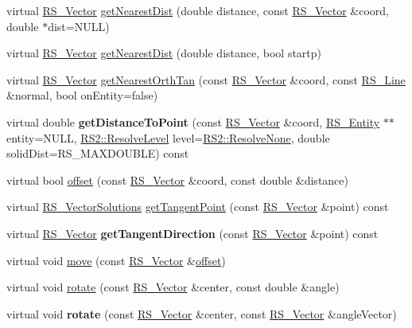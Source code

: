 \begin{DoxyCompactItemize}
\item 
virtual \hyperlink{classRS__Vector}{R\-S\-\_\-\-Vector} \hyperlink{classRS__Circle_a8a7912f997924444bdfa100523d45277}{get\-Nearest\-Dist} (double distance, const \hyperlink{classRS__Vector}{R\-S\-\_\-\-Vector} \&coord, double $\ast$dist=N\-U\-L\-L)
\item 
virtual \hyperlink{classRS__Vector}{R\-S\-\_\-\-Vector} \hyperlink{classRS__Circle_ae2e411dd60b5b677287dde169e562ad9}{get\-Nearest\-Dist} (double distance, bool startp)
\item 
virtual \hyperlink{classRS__Vector}{R\-S\-\_\-\-Vector} \hyperlink{classRS__Circle_a89c9c99d158048aed5c04367e4c7ab56}{get\-Nearest\-Orth\-Tan} (const \hyperlink{classRS__Vector}{R\-S\-\_\-\-Vector} \&coord, const \hyperlink{classRS__Line}{R\-S\-\_\-\-Line} \&normal, bool on\-Entity=false)
\item 
\hypertarget{classRS__Circle_ad7cb3c8cd0ae93cb5d62aa355a77c2d9}{virtual double {\bfseries get\-Distance\-To\-Point} (const \hyperlink{classRS__Vector}{R\-S\-\_\-\-Vector} \&coord, \hyperlink{classRS__Entity}{R\-S\-\_\-\-Entity} $\ast$$\ast$entity=N\-U\-L\-L, \hyperlink{classRS2_a1b2c5e3a3e9d1b03a9564229255faa20}{R\-S2\-::\-Resolve\-Level} level=\hyperlink{classRS2_a1b2c5e3a3e9d1b03a9564229255faa20aecb7396f39bc313ad8903c8a5fac5a50}{R\-S2\-::\-Resolve\-None}, double solid\-Dist=R\-S\-\_\-\-M\-A\-X\-D\-O\-U\-B\-L\-E) const }\label{classRS__Circle_ad7cb3c8cd0ae93cb5d62aa355a77c2d9}

\item 
virtual bool \hyperlink{classRS__Circle_a0dec1d2723496184c23c56a4069f71bd}{offset} (const \hyperlink{classRS__Vector}{R\-S\-\_\-\-Vector} \&coord, const double \&distance)
\item 
virtual \hyperlink{classRS__VectorSolutions}{R\-S\-\_\-\-Vector\-Solutions} \hyperlink{classRS__Circle_a3532ee70c661851fd92e320ef96a055d}{get\-Tangent\-Point} (const \hyperlink{classRS__Vector}{R\-S\-\_\-\-Vector} \&point) const 
\item 
\hypertarget{classRS__Circle_adbb86c1a6d7311dce3a2e8004b43e9f5}{virtual \hyperlink{classRS__Vector}{R\-S\-\_\-\-Vector} {\bfseries get\-Tangent\-Direction} (const \hyperlink{classRS__Vector}{R\-S\-\_\-\-Vector} \&point) const }\label{classRS__Circle_adbb86c1a6d7311dce3a2e8004b43e9f5}

\item 
virtual void \hyperlink{classRS__Circle_ac6905ddaecd0924a688bcc25d18d57ee}{move} (const \hyperlink{classRS__Vector}{R\-S\-\_\-\-Vector} \&\hyperlink{classRS__Circle_a0dec1d2723496184c23c56a4069f71bd}{offset})
\item 
virtual void \hyperlink{classRS__Circle_a54f74b4c0d2b67e1d5ee2d7691dc06fb}{rotate} (const \hyperlink{classRS__Vector}{R\-S\-\_\-\-Vector} \&center, const double \&angle)
\item 
\hypertarget{classRS__Circle_ad2e5a657064029ccff8b139991f1f3d7}{virtual void {\bfseries rotate} (const \hyperlink{classRS__Vector}{R\-S\-\_\-\-Vector} \&center, const \hyperlink{classRS__Vector}{R\-S\-\_\-\-Vector} \&angle\-Vector)}\label{classRS__Circle_ad2e5a657064029ccff8b139991f1f3d7}


\end{DoxyCompactItemize}
